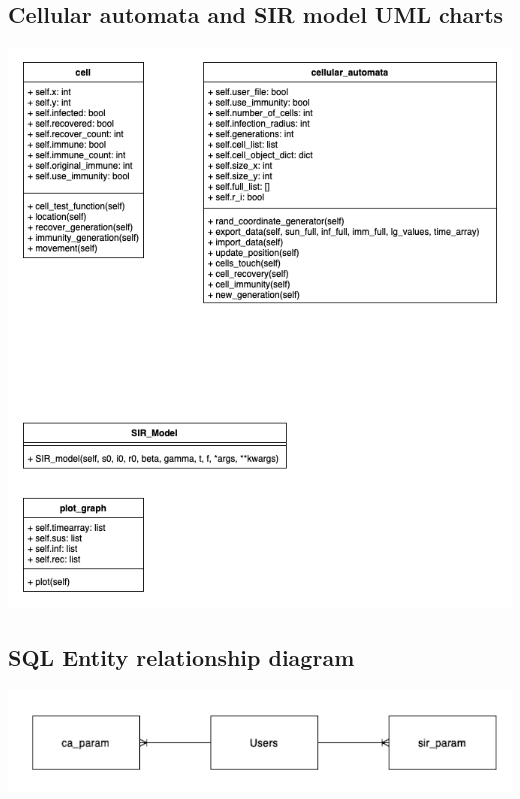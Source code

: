 \documentclass[11pt, a4paper]{article}
\begin{document}
\subsection{Cellular automata and SIR model UML charts}
\includegraphics[width=\textwidth]{uml_ca_sir.png}
\subsection{SQL Entity relationship diagram}
\includegraphics[width=\textwidth]{re_sql.png}
\end{document}
